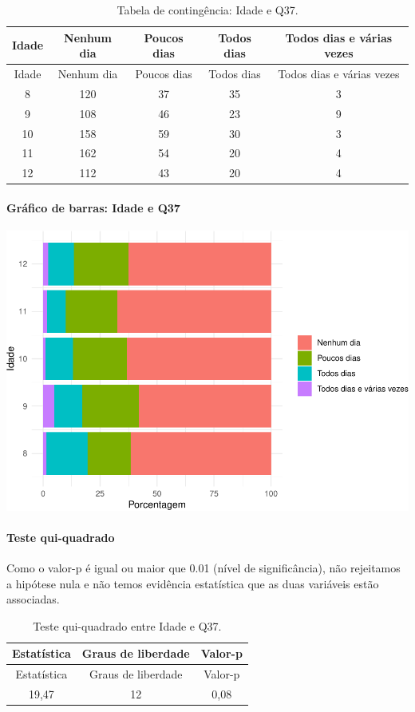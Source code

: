 \documentclass[]{article}
\let\oldparagraph\paragraph
\renewcommand{\paragraph}[1]{\oldparagraph{#1}\mbox{}}
\begin{document}
\begin{longtable}[]{@{}ccccc@{}}
\caption{\label{tab:unnamed-chunk-1389}Tabela de contingência: Idade e Q37.}\tabularnewline
\toprule
Idade & Nenhum dia & Poucos dias & Todos dias & Todos dias e várias vezes\tabularnewline
\midrule
\endfirsthead
\toprule
Idade & Nenhum dia & Poucos dias & Todos dias & Todos dias e várias vezes\tabularnewline
\midrule
\endhead
8 & 120 & 37 & 35 & 3\tabularnewline
9 & 108 & 46 & 23 & 9\tabularnewline
10 & 158 & 59 & 30 & 3\tabularnewline
11 & 162 & 54 & 20 & 4\tabularnewline
12 & 112 & 43 & 20 & 4\tabularnewline
\bottomrule
\end{longtable}

\hypertarget{gruxe1fico-de-barras-idade-e-q37}{%
\paragraph{Gráfico de barras: Idade e Q37}\label{gruxe1fico-de-barras-idade-e-q37}}

\begin{center}\includegraphics[width=0.75\linewidth]{relatorio_covid19_files/figure-latex/unnamed-chunk-1390-1} \end{center}

\hypertarget{teste-qui-quadrado-119}{%
\paragraph{Teste qui-quadrado}\label{teste-qui-quadrado-119}}

Como o valor-p é igual ou maior que 0.01 (nível de significância), não rejeitamos a hipótese nula e não temos evidência estatística que as duas variáveis estão associadas.

\begin{longtable}[]{@{}ccc@{}}
\caption{\label{tab:unnamed-chunk-1392}Teste qui-quadrado entre Idade e Q37.}\tabularnewline
\toprule
Estatística & Graus de liberdade & Valor-p\tabularnewline
\midrule
\endfirsthead
\toprule
Estatística & Graus de liberdade & Valor-p\tabularnewline
\midrule
\endhead
19,47 & 12 & 0,08\tabularnewline
\bottomrule
\end{longtable}
\end{document}
